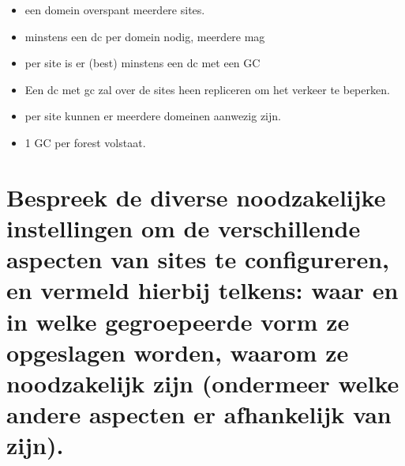 \begin{itemize}
\item een domein overspant meerdere sites.
\item minstens een dc per domein nodig, meerdere mag
\item per site is er (best) minstens een dc met een GC
\item Een dc met gc zal over de sites heen repliceren om het verkeer te beperken.
\item per site kunnen er meerdere domeinen aanwezig zijn.
\item 1 GC per forest volstaat.
\end{itemize}

\section{Bespreek de diverse noodzakelijke instellingen om de verschillende aspecten van sites te configureren, en vermeld hierbij telkens: waar en in welke gegroepeerde vorm ze opgeslagen worden, waarom ze noodzakelijk zijn (ondermeer welke andere aspecten er afhankelijk van zijn).}
